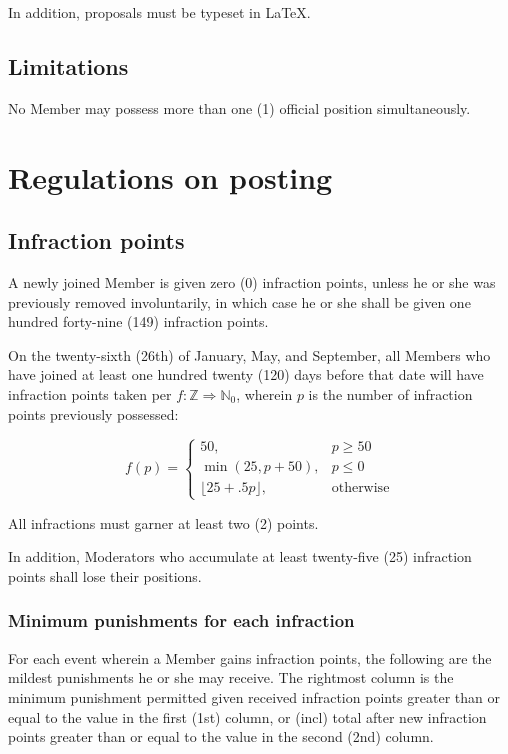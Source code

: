 \documentclass[10pt]{book}
\begin{document}
In addition, proposals must be typeset in \LaTeX.

\section{Limitations}

No Member may possess more than one (1) official position simultaneously.

\chapter{Regulations on posting}
\label{chapter:postreg}

\section{Infraction points}

A newly joined Member is given zero (0) infraction points, unless he or she was previously removed involuntarily, in which case he or she shall be given one hundred forty-nine (149) infraction points.

On the twenty-sixth (26th) of January, May, and September, all Members who have joined at least one hundred twenty (120) days before that date will have infraction points taken per $f : \mathbb{Z} \Rightarrow \mathbb{N}_0$, wherein $p$ is the number of infraction points previously possessed:

$$f(p) = \left\lbrace \begin{array}{rl}
 50, & p \ge 50 \\
 \min(25, p + 50), & p \le 0 \\
 \lfloor25 + .5p\rfloor, & \text{otherwise}
\end{array} \right. $$

All infractions must garner at least two (2) points.

In addition, Moderators who accumulate at least twenty-five (25) infraction points shall lose their positions.

\subsection{Minimum punishments for each infraction}
\label{subsec:postcons}

For each event wherein a Member gains infraction points, the following are the mildest punishments he or she may receive. The rightmost column is the minimum punishment permitted given received infraction points greater than or equal to the value in the first (1st) column, or (incl) total after new infraction points greater than or equal to the value in the second (2nd) column.
\end{document}
